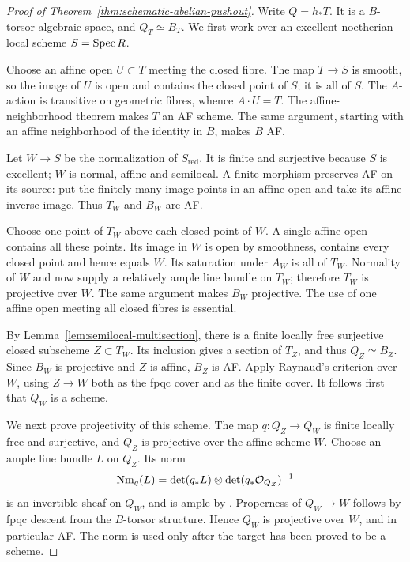 \begin{proof}[Proof of Theorem~\ref{thm:schematic-abelian-pushout}]
Write $Q=h_*T$. It is a $B$-torsor algebraic space, and
$Q_T\simeq B_T$. We first work over an excellent noetherian local
scheme $S=\operatorname{Spec} R$.

Choose an affine open $U\subset T$ meeting the closed fibre.
The map $T\to S$ is smooth, so the image of $U$ is open and contains
the closed point of $S$; it is all of $S$. The $A$-action is transitive
on geometric fibres, whence $A\cdot U=T$.
The affine-neighborhood theorem \cite[\S6.6, Theorem~2(c)]{BLR}
makes $T$ an AF scheme. The same argument, starting with an affine
neighborhood of the identity in $B$, makes $B$ AF.

Let $W\to S$ be the normalization of $S_{\mathrm{red}}$.
It is finite and surjective because $S$ is excellent; $W$ is normal,
affine and semilocal. A finite morphism preserves AF on its source:
put the finitely many image points in an affine open and take its
affine inverse image. Thus $T_W$ and $B_W$ are AF.

Choose one point of $T_W$ above each closed point of $W$.
A single affine open contains all these points. Its image in $W$
is open by smoothness, contains every closed point and hence equals
$W$. Its saturation under $A_W$ is all of $T_W$.
Normality of $W$ and \cite[\S6.6, Theorem~2(d)]{BLR} now supply
a relatively ample line bundle on $T_W$; therefore $T_W$ is
projective over $W$. The same argument makes $B_W$ projective.
The use of one affine open meeting all closed fibres is essential.

By Lemma~\ref{lem:semilocal-multisection}, there is a finite locally
free surjective closed subscheme $Z\subset T_W$. Its inclusion gives
a section of $T_Z$, and thus $Q_Z\simeq B_Z$.
Since $B_W$ is projective and $Z$ is affine, $B_Z$ is AF.
Apply Raynaud's criterion over $W$, using $Z\to W$ both as the fpqc
cover and as the finite cover. It follows first that $Q_W$ is a
scheme.

We next prove projectivity of this scheme. The map
$q:Q_Z\to Q_W$ is finite locally free and surjective, and $Q_Z$ is
projective over the affine scheme $W$. Choose an ample line bundle
$L$ on $Q_Z$. Its norm
\[
 \operatorname{Nm}_{q}(L)
 =\det(q_*L)\otimes\det(q_*\mathcal O_{Q_Z})^{-1}
\]
is an invertible sheaf on $Q_W$, and is ample by
\cite[II, Proposition~6.6.1 and Corollary~6.6.4]{EGA}.
Properness of $Q_W\to W$ follows by fpqc descent from the $B$-torsor
structure. Hence $Q_W$ is projective over $W$, and in particular AF.
The norm is used only after the target has been proved to be a scheme.


\end{proof}
